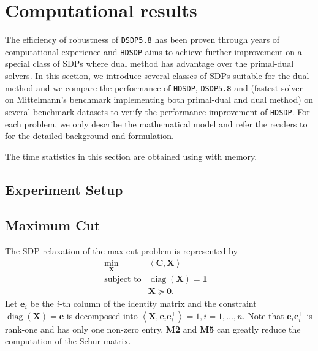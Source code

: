\section{Computational results}

The efficiency of robustness of {{\texttt{DSDP5.8}}} has been proven through
years of computational experience and {{\texttt{HDSDP}}} aims to achieve
further improvement on a special class of SDPs where dual method has
advantage over the primal-dual solvers. In this section, we introduce several
classes of SDPs suitable for the dual method and we compare the performance
of {{\texttt{HDSDP}}}, {{\texttt{DSDP5.8}}} and  (fastest solver on Mittelmann's benchmark implementing both primal-dual and dual method) on
several benchmark datasets to verify the performance improvement of
{{\texttt{HDSDP}}}. For each problem, we only describe the mathematical model
and refer the readers to
{\cite{mittelmann2003independent,borchers1999sdplib}} for the detailed
background and formulation. 

The time statistics in this section are obtained
using  with
 memory.

\subsection{Experiment Setup}

\subsection{Maximum Cut}

The SDP relaxation of the max-cut problem is represented by
\begin{eqnarray*}
  \min_{\mathbf{X}} & \left\langle \mathbf{C}, \mathbf{X} \right\rangle & \\
  \text{subject to} & \ensuremath{\operatorname{diag}} \left( \mathbf{X} \right) = \textbf{1} & \\
  & \mathbf{X} \succeq \textbf{0} . & 
\end{eqnarray*}
Let $\mathbf{e}_i$ be the $i$-th column of the identity matrix and the constraint
$\ensuremath{\operatorname{diag}} \left( \mathbf{X} \right) = \mathbf{e}$ is decomposed into $\left\langle \mathbf{X}, \mathbf{e}_i
\mathbf{e}_i^{\top} \right\rangle = 1, i = 1, \ldots, n$. Note that $\mathbf{e}_i \mathbf{e}_i^{\top}$
is rank-one and has only one non-zero entry, {\textbf{M2}} and
{\textbf{M5}} can greatly reduce the computation of the Schur matrix.

